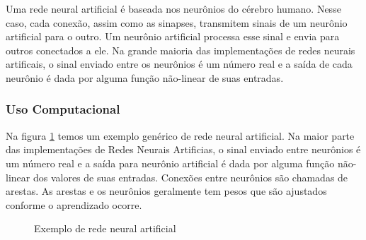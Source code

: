 Uma rede neural artificial é baseada nos neurônios do cérebro humano. Nesse caso, cada conexão, assim como as sinapses, transmitem sinais de um neurônio artificial para o outro. Um neurônio artificial processa esse sinal e envia para outros conectados a ele. Na grande maioria das implementações de redes neurais artificais, o sinal enviado entre os neurônios é um número real e a saída de cada neurônio é dada por alguma função não-linear de suas entradas.

\subsubsection{Uso Computacional}
Na figura \ref{fig:rna} temos um exemplo genérico de rede neural artificial. Na maior parte das implementações de Redes Neurais Artificias, o sinal enviado entre neurônios é um número real e a saída para neurônio artificial é dada por alguma função não-linear dos valores de suas entradas. Conexões entre neurônios são chamadas de arestas. As arestas e os neurônios geralmente tem pesos que são ajustados conforme o aprendizado ocorre. 

\def\layersep{3.5cm}

\begin{figure}[!ht]
  \centering
  \caption{Exemplo de rede neural artificial}
  \label{fig:rna}
\end{figure}

